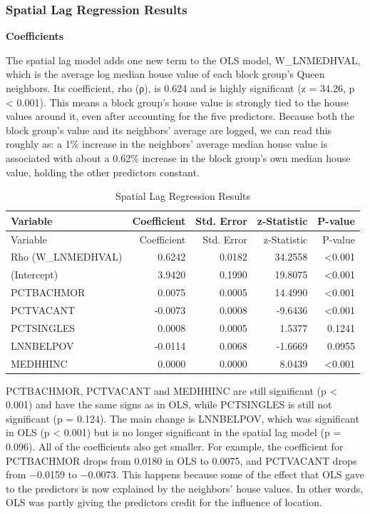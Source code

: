 \documentclass[
  12pt,
]{article}
\begin{document}
\subsubsection{Spatial Lag Regression
Results}\label{spatial-lag-regression-results}

\textbf{Coefficients}

The spatial lag model adds one new term to the OLS model, W\_LNMEDHVAL,
which is the average log median house value of each block group's Queen
neighbors. Its coefficient, rho (ρ), is 0.624 and is highly significant
(z = 34.26, p \textless{} 0.001). This means a block group's house value
is strongly tied to the house values around it, even after accounting
for the five predictors. Because both the block group's value and its
neighbors' average are logged, we can read this roughly as: a 1\%
increase in the neighbors' average median house value is associated with
about a 0.62\% increase in the block group's own median house value,
holding the other predictors constant.

\begin{longtable}[]{@{}lrrrr@{}}
\caption{Spatial Lag Regression Results}\tabularnewline
\toprule\noalign{}
Variable & Coefficient & Std. Error & z-Statistic & P-value \\
\midrule\noalign{}
\endfirsthead
\toprule\noalign{}
Variable & Coefficient & Std. Error & z-Statistic & P-value \\
\midrule\noalign{}
\endhead
\bottomrule\noalign{}
\endlastfoot
Rho (W\_LNMEDHVAL) & 0.6242 & 0.0182 & 34.2558 & \textless0.001 \\
(Intercept) & 3.9420 & 0.1990 & 19.8075 & \textless0.001 \\
PCTBACHMOR & 0.0075 & 0.0005 & 14.4990 & \textless0.001 \\
PCTVACANT & -0.0073 & 0.0008 & -9.6436 & \textless0.001 \\
PCTSINGLES & 0.0008 & 0.0005 & 1.5377 & 0.1241 \\
LNNBELPOV & -0.0114 & 0.0068 & -1.6669 & 0.0955 \\
MEDHHINC & 0.0000 & 0.0000 & 8.0439 & \textless0.001 \\
\end{longtable}

PCTBACHMOR, PCTVACANT and MEDHHINC are still significant (p \textless{}
0.001) and have the same signs as in OLS, while PCTSINGLES is still not
significant (p = 0.124). The main change is LNNBELPOV, which was
significant in OLS (p \textless{} 0.001) but is no longer significant in
the spatial lag model (p = 0.096). All of the coefficients also get
smaller. For example, the coefficient for PCTBACHMOR drops from 0.0180
in OLS to 0.0075, and PCTVACANT drops from −0.0159 to −0.0073. This
happens because some of the effect that OLS gave to the predictors is
now explained by the neighbors' house values. In other words, OLS was
partly giving the predictors credit for the influence of location.
\end{document}
